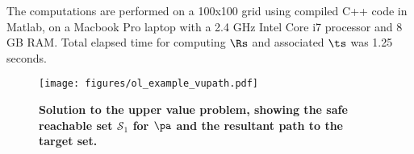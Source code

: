 The computations are performed on a 100x100 grid using compiled C++ code in Matlab, on a Macbook Pro laptop with a 2.4 GHz Intel Core i7 processor and 8 GB RAM.
Total elapsed time for computing $\Rs$ and associated $\ts$ was 1.25 seconds.

\begin{figure}[t]
	\centering
		\texttt{[image: figures/ol\_example\_vupath.pdf]}  
	\caption{\textbf{Solution to the upper value problem, showing the safe reachable set $\mathcal{S}_1$ for $\pa$ and the resultant path to the target set. }}
	\label{fig:results_vu}
\end{figure} 
